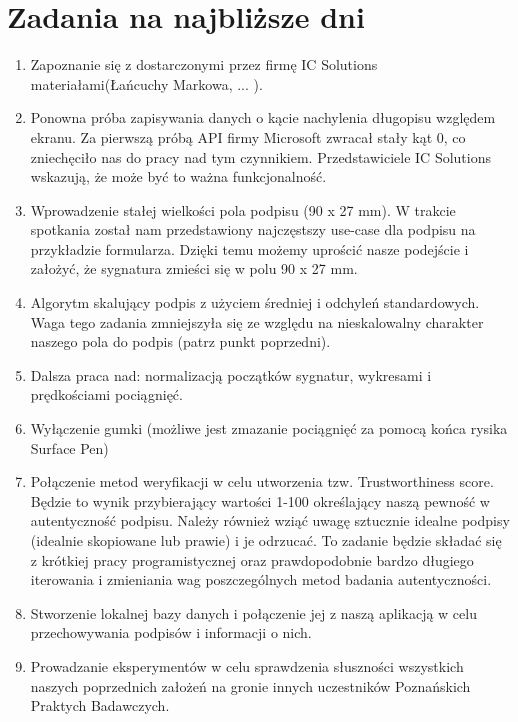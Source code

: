 \documentclass{mwrep}
\begin{document}
{\let\clearpage\relax \chapter{Zadania na najbliższe dni}}
\begin{enumerate} 
	\item Zapoznanie się z dostarczonymi przez firmę IC Solutions materiałami(Łańcuchy Markowa, ... ).
    \item Ponowna próba zapisywania danych o kącie nachylenia długopisu względem ekranu. Za pierwszą próbą API firmy Microsoft zwracał stały kąt 0, co zniechęciło nas do pracy nad tym czynnikiem. Przedstawiciele IC Solutions wskazują, że może być to ważna funkcjonalność.
    \item Wprowadzenie stałej wielkości pola podpisu (90 x 27 mm). W trakcie spotkania został nam przedstawiony najczęstszy use-case dla podpisu na przykładzie formularza. Dzięki temu możemy uprościć nasze podejście i założyć, że sygnatura zmieści się w polu 90 x 27 mm.
    \item Algorytm skalujący podpis z użyciem średniej i odchyleń standardowych. Waga tego zadania zmniejszyła się ze względu na nieskalowalny charakter naszego pola do podpis (patrz punkt poprzedni).
    \item Dalsza praca nad: normalizacją początków sygnatur, wykresami i prędkościami pociągnięć.
    \item Wyłączenie gumki (możliwe jest zmazanie pociągnięć za pomocą końca rysika Surface Pen)
    \item Połączenie metod weryfikacji w celu utworzenia tzw. Trustworthiness score. Będzie to wynik przybierający wartości 1-100 określający naszą pewność w autentyczność podpisu. Należy również wziąć uwagę sztucznie idealne podpisy (idealnie skopiowane lub prawie) i je odrzucać.
    To zadanie będzie składać się z krótkiej pracy programistycznej oraz prawdopodobnie bardzo długiego iterowania i zmieniania wag poszczególnych metod badania autentyczności.
    \item Stworzenie lokalnej bazy danych i połączenie jej z naszą aplikacją w celu przechowywania podpisów i informacji o nich.   
    \item Prowadzanie eksperymentów w celu sprawdzenia słuszności wszystkich naszych poprzednich założeń na gronie innych uczestników Poznańskich Praktych Badawczych.
\end{enumerate}
\end{document}
